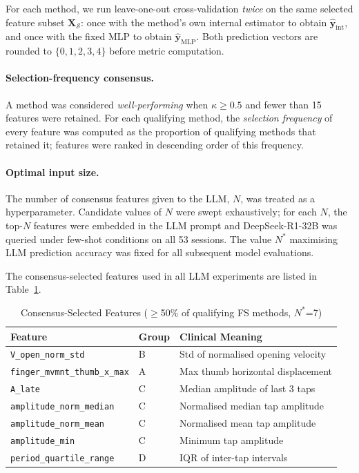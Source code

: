 \documentclass[12pt, a4paper]{article}
\begin{document}
For each method, we run leave-one-out cross-validation \emph{twice} on the same selected
feature subset $\mathbf{X}_{\mathcal{S}}$: once with the method's own internal estimator
to obtain $\hat{\mathbf{y}}_{\mathrm{int}}$, and once with the fixed MLP to obtain
$\hat{\mathbf{y}}_{\mathrm{MLP}}$.
Both prediction vectors are rounded to $\{0,1,2,3,4\}$ before metric computation.

\paragraph{Selection-frequency consensus.}
A method was considered \emph{well-performing} when $\kappa \geq 0.5$ and fewer than
15 features were retained.
For each qualifying method, the \emph{selection frequency} of every feature was computed
as the proportion of qualifying methods that retained it; features were ranked in
descending order of this frequency.

\paragraph{Optimal input size.}
The number of consensus features given to the LLM, $N$, was treated as a
hyperparameter.
Candidate values of $N$ were swept exhaustively; for each $N$, the top-$N$ features were
embedded in the LLM prompt and DeepSeek-R1-32B was queried under few-shot conditions
on all 53 sessions.
The value $N^{*}$ maximising LLM prediction accuracy was fixed for all subsequent
model evaluations.

The consensus-selected features used in all LLM experiments are listed in
Table~\ref{tab:selected_features}.

\begin{table}[htbp]
    \centering
    \caption{Consensus-Selected Features ($\geq$50\% of qualifying FS methods, $N^{*}$=7)}
    \label{tab:selected_features}
    \renewcommand{\arraystretch}{1.2}
    \begin{tabular}{lll}
        \toprule
        \textbf{Feature} & \textbf{Group} & \textbf{Clinical Meaning} \\
        \midrule
        \texttt{V\_open\_norm\_std}           & B & Std of normalised opening velocity \\
        \texttt{finger\_mvmnt\_thumb\_x\_max} & A & Max thumb horizontal displacement \\
        \texttt{A\_late}                      & C & Median amplitude of last 3 taps \\
        \texttt{amplitude\_norm\_median}      & C & Normalised median tap amplitude \\
        \texttt{amplitude\_norm\_mean}        & C & Normalised mean tap amplitude \\
        \texttt{amplitude\_min}               & C & Minimum tap amplitude \\
        \texttt{period\_quartile\_range}      & D & IQR of inter-tap intervals \\
        \bottomrule
    \end{tabular}
\end{table}
\end{document}
